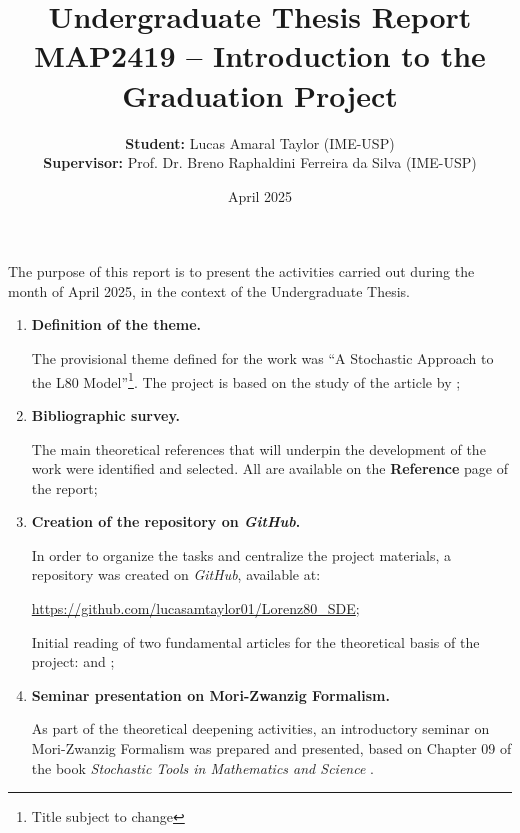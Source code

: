 \documentclass[12pt]{article}
\title{Undergraduate Thesis Report \\ \large{MAP2419 -- Introduction to the Graduation Project}}
\date{April 2025}
\author{
\textbf{Student:} Lucas Amaral Taylor (IME-USP)\\
\textbf{Supervisor:} Prof. Dr. Breno Raphaldini Ferreira da Silva (IME-USP)
}
\begin{document}
\maketitle

The purpose of this report is to present the activities carried out during the month of April 2025, in the context of the Undergraduate Thesis.

\begin{enumerate}
\item \textbf{Definition of the theme.}

The provisional theme defined for the work was ``A Stochastic Approach to the L80 Model''\footnote{Title subject to change}. The project is based on the study of the article by \citet{Chekroun2021};

\item \textbf{Bibliographic survey.}

The main theoretical references that will underpin the development of the work were identified and selected. All are available on the \textbf{Reference} page of the report;

\item \textbf{Creation of the repository on \textit{GitHub}.}

In order to organize the tasks and centralize the project materials, a repository was created on \textit{GitHub}, available at:

\textcolor{blue}{\href{https://github.com/lucasamtaylor01/Lorenz80_SDE}{https://github.com/lucasamtaylor01/Lorenz80\_SDE}};


Initial reading of two fundamental articles for the theoretical basis of the project: \citet{Chekroun2017} and \citet{Chekroun2021};

\item \textbf{Seminar presentation on Mori-Zwanzig Formalism.}

As part of the theoretical deepening activities, an introductory seminar on Mori-Zwanzig Formalism was prepared and presented, based on Chapter 09 of the book \textit{Stochastic Tools in Mathematics and Science} \citep{Chorin2013}. 

\end{enumerate}

\newpage
\nocite{*}
\printbibliography
\end{document}
